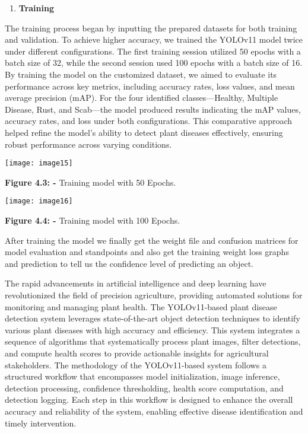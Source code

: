 \documentclass{book} %
\begin{document}
\begin{enumerate}
\item  \textbf{Training}
\end{enumerate}

\noindent      The training process began by inputting the prepared datasets for both training and validation. To achieve higher accuracy, we trained the YOLOv11 model twice under different configurations. The first training session utilized 50 epochs with a batch size of 32, while the second session used 100 epochs with a batch size of 16. By training the model on the customized dataset, we aimed to evaluate its performance across key metrics, including accuracy rates, loss values, and mean average precision (mAP). For the four identified classes---Healthy, Multiple Disease, Rust, and Scab---the model produced results indicating the mAP values, accuracy rates, and loss under both configurations. This comparative approach helped refine the model's ability to detect plant diseases effectively, ensuring robust performance across varying conditions.

\noindent 

\noindent \texttt{[image: image15]}

\noindent \textbf{             Figure 4.3: -} Training model with 50 Epochs.

\noindent \texttt{[image: image16]}

\noindent \textbf{             Figure 4.4: -} Training model with 100 Epochs.

\noindent After training the model we finally get the weight file and confusion matrices for model evaluation and standpoints and also get the training weight loss graphs and prediction to tell us the confidence level of predicting an object.

\noindent The rapid advancements in artificial intelligence and deep learning have revolutionized the field of precision agriculture, providing automated solutions for monitoring and managing plant health. The YOLOv11-based plant disease detection system leverages state-of-the-art object detection techniques to identify various plant diseases with high accuracy and efficiency. This system integrates a sequence of algorithms that systematically process plant images, filter detections, and compute health scores to provide actionable insights for agricultural stakeholders. The methodology of the YOLOv11-based system follows a structured workflow that encompasses model initialization, image inference, detection processing, confidence thresholding, health score computation, and detection logging. Each step in this workflow is designed to enhance the overall accuracy and reliability of the system, enabling effective disease identification and timely intervention.
\end{document}

